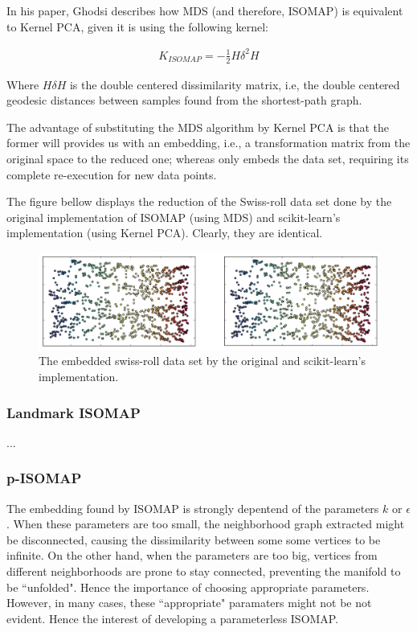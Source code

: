 \documentclass[12pt]{report}
\begin{document}
In his paper, Ghodsi describes how MDS (and therefore, ISOMAP) is equivalent to Kernel PCA, given it is using the following kernel: \cite{gho2006}

\begin{align*}
K_{ISOMAP} = -\frac{1}{2}H \delta^2 H
\end{align*}

Where $H \delta H$ is the double centered dissimilarity matrix, i.e, the double centered geodesic distances between samples found from the shortest-path graph.

The advantage of substituting the MDS algorithm by Kernel PCA is that the former will provides us with an embedding, i.e., a transformation matrix from the original space to the reduced one; whereas only embeds the data set, requiring its complete re-execution for new data points. \cite{ham2004kernel}

The figure bellow displays the reduction of the Swiss-roll data set done by the original implementation of ISOMAP (using MDS) and scikit-learn's implementation (using Kernel PCA). Clearly, they are identical.

\begin{figure}[H]
	\centering
	\includegraphics[width=\linewidth]{experiments/iso_comp_my_and_sklearn}
	\captionsetup{justification=centering}
	\caption{The embedded swiss-roll data set by the original and scikit-learn's implementation.}
\end{figure}

\subsubsection{Landmark ISOMAP}

...

\subsubsection{p-ISOMAP}

The embedding found by ISOMAP is strongly depentend of the parameters $k$ or $\epsilon$. When these parameters are too small, the neighborhood graph extracted might be disconnected, causing the dissimilarity between some some vertices to be infinite. On the other hand, when the parameters are too big, vertices from different neighborhoods are prone to stay connected, preventing the manifold to be ``unfolded". Hence the importance of choosing appropriate parameters. However, in many cases, these ``appropriate" paramaters might not be not evident. Hence the interest of developing a parameterless ISOMAP.
\end{document}
